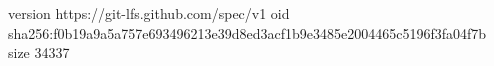 version https://git-lfs.github.com/spec/v1
oid sha256:f0b19a9a5a757e693496213e39d8ed3acf1b9e3485e2004465c5196f3fa04f7b
size 34337
